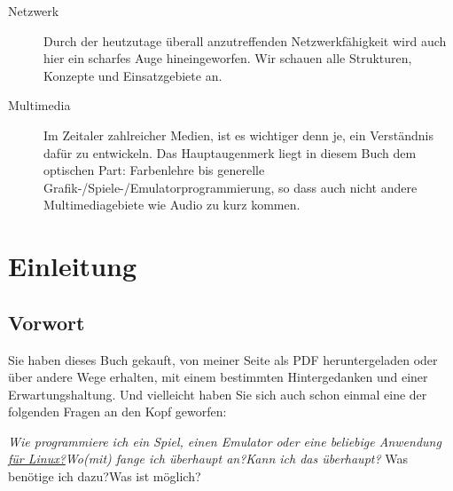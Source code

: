 \documentclass[b5paper,10pt,dvips,fleqn,titlepage,twoside]{book}
\begin{document}
\begin{titlepage}
\begin{center}
\begin{small}
\begin{description}
\item[Netzwerk]{Durch der heutzutage überall anzutreffenden Netzwerkfähigkeit wird auch hier ein scharfes Auge hineingeworfen. Wir schauen alle Strukturen, Konzepte und Einsatzgebiete an.}
\item[Multimedia]{Im Zeitaler zahlreicher Medien, ist es wichtiger denn je, ein Verständnis dafür zu entwickeln. Das Hauptaugenmerk liegt in diesem Buch dem optischen Part: Farbenlehre bis generelle Grafik-/Spiele-/Emulatorprogrammierung, so dass auch nicht andere Multimediagebiete wie Audio zu kurz kommen.}
\end{description}

\end{small}

\end{center}
\bigskip


\end{titlepage}
\newpage
\tableofcontents
\setcounter{secnumdepth}{2}
\part{Einleitung}
\chapter{Vorwort}
Sie haben dieses Buch gekauft, von meiner Seite als PDF heruntergeladen oder über andere Wege erhalten, mit einem bestimmten Hintergedanken und einer Erwartungshaltung. Und vielleicht haben Sie sich auch schon einmal eine der folgenden Fragen an den Kopf geworfen:

\begin{flushleft}
\emph{
Wie programmiere ich ein Spiel, einen Emulator oder eine beliebige Anwendung \underline{f\"{u}r Linux?}\newline Wo(mit) fange ich \"{u}berhaupt an?\newline Kann ich das überhaupt?}\newline
Was benötige ich dazu?\newline Was ist möglich?\newline
\end{flushleft}
\end{document}
